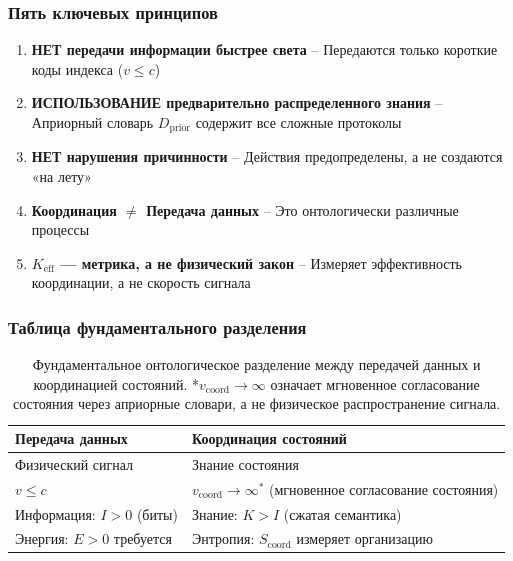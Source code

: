 \documentclass[11pt,a4paper]{article}
\begin{document}
	\subsubsection{Пять ключевых принципов}
	
	\begin{enumerate}[leftmargin=*]
		\item \textbf{НЕТ передачи информации быстрее света} – Передаются только короткие коды индекса ($v \leq c$)
		\item \textbf{ИСПОЛЬЗОВАНИЕ предварительно распределенного знания} – Априорный словарь $D_{\text{prior}}$ содержит все сложные протоколы
		\item \textbf{НЕТ нарушения причинности} – Действия предопределены, а не создаются «на лету»
		\item \textbf{Координация $\neq$ Передача данных} – Это онтологически различные процессы
		\item \textbf{$K_{\mathrm{eff}}$ — метрика, а не физический закон} – Измеряет эффективность координации, а не скорость сигнала
	\end{enumerate}
	
	\subsubsection{Таблица фундаментального разделения}
	
	\begin{table}[H]
		\centering
		\begin{tabular}{|p{}|p{}|}
			\hline
			\textbf{Передача данных} & \textbf{Координация состояний} \\
			\hline
			Физический сигнал & Знание состояния \\
			$v \leq c$ & $v_{\text{coord}} \to \infty^*$ (мгновенное согласование состояния) \\
			Информация: $I > 0$ (биты) & Знание: $K > I$ (сжатая семантика) \\
			Энергия: $E > 0$ требуется & Энтропия: $S_{\text{coord}}$ измеряет организацию \\
			\hline
		\end{tabular}
		\caption{Фундаментальное онтологическое разделение между передачей данных и координацией состояний. *$v_{\text{coord}} \to \infty$ означает мгновенное согласование состояния через априорные словари, а не физическое распространение сигнала.}
		\label{tab:coordination-vs-data}
	\end{table}
	
\end{document}
